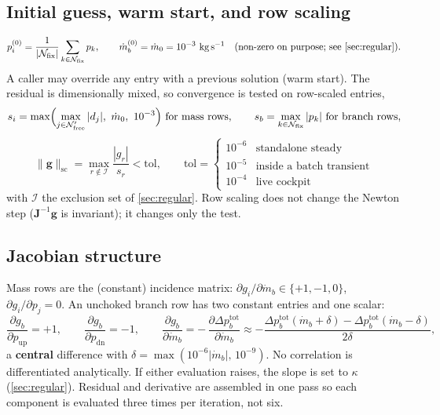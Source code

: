 \documentclass[11pt,a4paper]{article}
\newcommand{\mdot}{\dot{m}}
\newcommand{\dd}[2]{\frac{\partial #1}{\partial #2}}
\newcommand{\Nfix}{\mathcal{N}_{\mathrm{fix}}}
\newcommand{\Nfree}{\mathcal{N}_{\mathrm{free}}}
\begin{document}
\subsection{Initial guess, warm start, and row scaling}
\begin{equation}
  p_i^{(0)} = \frac{1}{|\Nfix|}\sum_{k\in\Nfix}p_k,\qquad
  \mdot_b^{(0)} = \mdot_0 = 10^{-3}\ \si{\kilogram\per\second}
  \quad\text{(non-zero on purpose; see \cref{sec:regular})}.
\end{equation}
A caller may override any entry with a previous solution (warm start). The
residual is dimensionally mixed, so convergence is tested on row-scaled entries,
\begin{equation}
  s_i = \max\Bigl(\max_{j\in\Nfree'}|d_j|,\ \mdot_0,\ 10^{-3}\Bigr)
  \ \text{for mass rows},\qquad
  s_b = \max_{k\in\Nfix}|p_k|\ \text{for branch rows},
  \label{eq:scales}
\end{equation}
\begin{equation}
  \|\mathbf{g}\|_{\mathrm{sc}} = \max_{r\notin\mathcal{I}}\frac{|g_r|}{s_r} < \mathrm{tol},
  \qquad
  \mathrm{tol} = \begin{cases}10^{-6} & \text{standalone steady}\\ 10^{-5} & \text{inside a batch transient}\\ 10^{-4} & \text{live cockpit}\end{cases}
  \label{eq:norm}
\end{equation}
with $\mathcal{I}$ the exclusion set of \cref{sec:regular}. Row scaling does not
change the Newton step ($\mathbf{J}^{-1}\mathbf{g}$ is invariant); it changes
only the test.

\subsection{Jacobian structure}\label{sec:jac}
Mass rows are the (constant) incidence matrix:
$\partial g_i/\partial\mdot_b\in\{+1,-1,0\}$, $\partial g_i/\partial p_j = 0$.
An unchoked branch row has two constant entries and one scalar:
\begin{equation}
  \dd{g_b}{p_{\mathrm{up}}}=+1,\qquad
  \dd{g_b}{p_{\mathrm{dn}}}=-1,\qquad
  \dd{g_b}{\mdot_b}=-\,\dd{\Delta p_b^{\mathrm{tot}}}{\mdot_b}
  \approx -\frac{\Delta p_b^{\mathrm{tot}}(\mdot_b+\delta)-\Delta p_b^{\mathrm{tot}}(\mdot_b-\delta)}{2\delta},
  \label{eq:fd}
\end{equation}
a \textbf{central} difference with $\delta = \max(10^{-6}|\mdot_b|,\,10^{-9})$.
No correlation is differentiated analytically. If either evaluation raises,
the slope is set to $\kappa$ (\cref{sec:regular}). Residual and derivative are
assembled in one pass so each component is evaluated three times per
iteration, not six.
\end{document}
